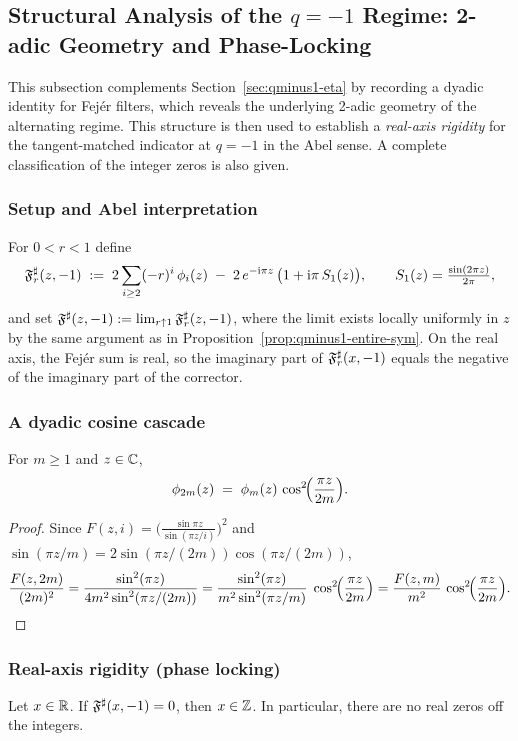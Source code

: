 \subsection{Structural Analysis of the \texorpdfstring{$q=-1$}{q=-1} Regime: 2-adic Geometry and Phase-Locking}
\label{subsec:struct-qminus1}

This subsection complements Section~\ref{sec:qminus1-eta} by recording a dyadic identity for Fej\'er filters, which reveals the underlying 2-adic geometry of the alternating regime. This structure is then used to establish a \emph{real-axis rigidity} for the tangent-matched indicator at $q=-1$ in the Abel sense. A complete classification of the integer zeros is also given.

\subsubsection*{Setup and Abel interpretation}
For $0<r<1$ define
\[
\mathfrak F^{\sharp}_r(z,-1)\;:=\;2\sum_{i\ge2}(-r)^i\,\phi_i(z)\;-\;2\,e^{-\mathrm{i}\pi z}\,\bigl(1+\mathrm{i}\pi\,S_1(z)\bigr),
\qquad
S_1(z)=\tfrac{\sin(2\pi z)}{2\pi},
\]
and set $\mathfrak F^{\sharp}(z,-1):=\lim_{r\uparrow1}\mathfrak F^{\sharp}_r(z,-1)$, where the limit exists locally uniformly in $z$ by the same argument as in Proposition~\ref{prop:qminus1-entire-sym}. On the real axis, the Fej\'er sum is real, so the imaginary part of $\mathfrak F^{\sharp}_r(x,-1)$ equals the negative of the imaginary part of the corrector.

\subsubsection*{A dyadic cosine cascade}
\begin{lemma}
\label{lem:dyadic-cascade}
For $m\ge1$ and $z\in\mathbb{C}$,
\[
\phi_{2m}(z)\;=\;\phi_{m}(z)\,\cos^{2}\!\Bigl(\frac{\pi z}{2m}\Bigr).
\]
\end{lemma}

\begin{proof}
Since $F(z,i)=\bigl(\frac{\sin\pi z}{\sin(\pi z/i)}\bigr)^2$ and $\sin(\pi z/m)=2\sin(\pi z/(2m))\cos(\pi z/(2m))$,
\[
\frac{F(z,2m)}{(2m)^2}
=\frac{\sin^2(\pi z)}{4m^2\sin^2(\pi z/(2m))}
=\frac{\sin^2(\pi z)}{m^2\sin^2(\pi z/m)}\;\cos^2\!\Bigl(\frac{\pi z}{2m}\Bigr)
=\frac{F(z,m)}{m^2}\,\cos^2\!\Bigl(\frac{\pi z}{2m}\Bigr).
\]
\end{proof}

\subsubsection*{Real-axis rigidity (phase locking)}
\begin{theorem}[Real-axis rigidity at $q=-1$ (Abel sense)]
\label{thm:qminus1-no-offinteger}
Let $x\in\mathbb{R}$. If $\mathfrak F^{\sharp}(x,-1)=0$, then $x\in\mathbb{Z}$. In particular, there are no real zeros off the integers.
\end{theorem}

